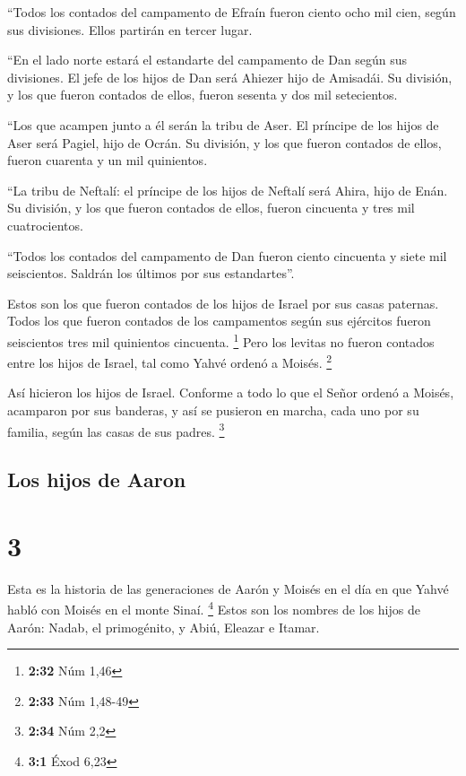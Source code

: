  ``Todos los contados del campamento de Efraín fueron
ciento ocho mil cien, según sus divisiones. Ellos partirán en tercer
lugar.

 ``En el lado norte estará el estandarte del campamento
de Dan según sus divisiones. El jefe de los hijos de Dan será Ahiezer
hijo de Amisadái.  Su división, y los que fueron contados
de ellos, fueron sesenta y dos mil setecientos.

 ``Los que acampen junto a él serán la tribu de Aser. El
príncipe de los hijos de Aser será Pagiel, hijo de Ocrán.
 Su división, y los que fueron contados de ellos, fueron
cuarenta y un mil quinientos.

 ``La tribu de Neftalí: el príncipe de los hijos de
Neftalí será Ahira, hijo de Enán.  Su división, y los que
fueron contados de ellos, fueron cincuenta y tres mil cuatrocientos.

 ``Todos los contados del campamento de Dan fueron ciento
cincuenta y siete mil seiscientos. Saldrán los últimos por sus
estandartes''.

 Estos son los que fueron contados de los hijos de Israel
por sus casas paternas. Todos los que fueron contados de los campamentos
según sus ejércitos fueron seiscientos tres mil quinientos cincuenta.
\footnote{\textbf{2:32} Núm 1,46}  Pero los levitas no
fueron contados entre los hijos de Israel, tal como Yahvé ordenó a
Moisés. \footnote{\textbf{2:33} Núm 1,48-49}

 Así hicieron los hijos de Israel. Conforme a todo lo que
el Señor ordenó a Moisés, acamparon por sus banderas, y así se pusieron
en marcha, cada uno por su familia, según las casas de sus padres.
\footnote{\textbf{2:34} Núm 2,2}

\hypertarget{los-hijos-de-aaron}{%
\subsection{Los hijos de Aaron}\label{los-hijos-de-aaron}}

\hypertarget{section-2}{%
\section{3}\label{section-2}}

 Esta es la historia de las generaciones de Aarón y Moisés
en el día en que Yahvé habló con Moisés en el monte Sinaí. \footnote{\textbf{3:1}
  Éxod 6,23}  Estos son los nombres de los hijos de Aarón:
Nadab, el primogénito, y Abiú, Eleazar e Itamar.

